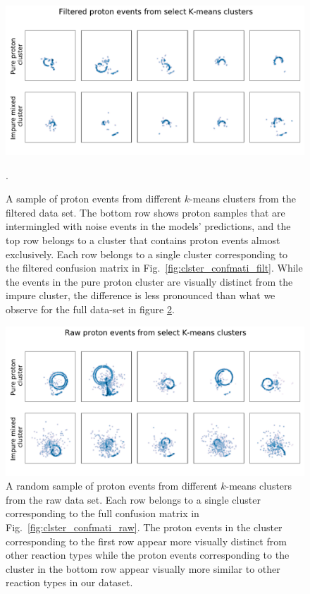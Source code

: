 \documentclass[preprint,12pt]{elsarticle}
\begin{document}
\begin{figure}
\includegraphics[width=\textwidth]{custom_work/Filteredexamples.pdf}
\caption[Filtered proton samples by cluster belonging]{A sample of proton events from different $k$-means clusters from the filtered data set. The bottom row shows proton samples that are intermingled with noise events in the models' predictions, and the top row belongs to a cluster that contains proton events almost exclusively. Each row belongs to a single cluster corresponding to the filtered confusion matrix in Fig.~\ref{fig:clster_confmati_filt}. While the events in the pure proton cluster are visually distinct from the impure cluster, the difference is less pronounced than what we observe for the full data-set in figure \ref{fig:full_vgg_clster_repr}. }\label{fig:filtered_vgg_clster_repr}.
\end{figure} 

\begin{figure}
\includegraphics[width=\textwidth]{custom_work/Rawexamples.pdf}
\caption[Full proton samples by cluster belonging]{A random sample of proton events from different $k$-means clusters from the raw data set.  Each row belongs to a single cluster corresponding to the full confusion matrix in Fig.~\ref{fig:clster_confmati_raw}. The proton events in the cluster corresponding to the first row appear more visually distinct from other reaction types while the proton events corresponding to the cluster in the bottom row appear visually more similar to other reaction types in our dataset. }\label{fig:full_vgg_clster_repr}
\end{figure} 
\end{document}
